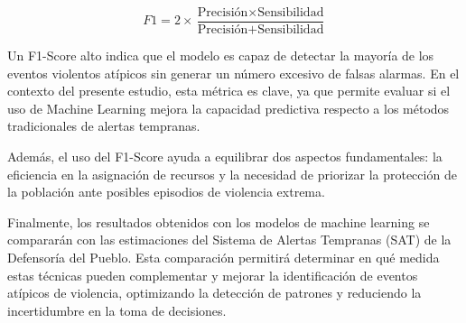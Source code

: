 \begin{equation}
F1 = 2 \times \frac{\text{Precisión} \times \text{Sensibilidad}}{\text{Precisión} + \text{Sensibilidad}}
\end{equation}

Un F1-Score alto indica que el modelo es capaz de detectar la mayoría de los eventos violentos atípicos sin generar un número excesivo de falsas alarmas. En el contexto del presente estudio, esta métrica es clave, ya que permite evaluar si el uso de Machine Learning mejora la capacidad predictiva respecto a los métodos tradicionales de alertas tempranas.

Además, el uso del F1-Score ayuda a equilibrar dos aspectos fundamentales: la eficiencia en la asignación de recursos y la necesidad de priorizar la protección de la población ante posibles episodios de violencia extrema.


Finalmente, los resultados obtenidos con los modelos de machine learning se compararán con las {estimaciones del Sistema de Alertas Tempranas (SAT)} de la Defensoría del Pueblo. Esta comparación permitirá determinar en qué medida estas técnicas pueden complementar y mejorar la identificación de eventos atípicos de violencia, optimizando la detección de patrones y reduciendo la incertidumbre en la toma de decisiones.
